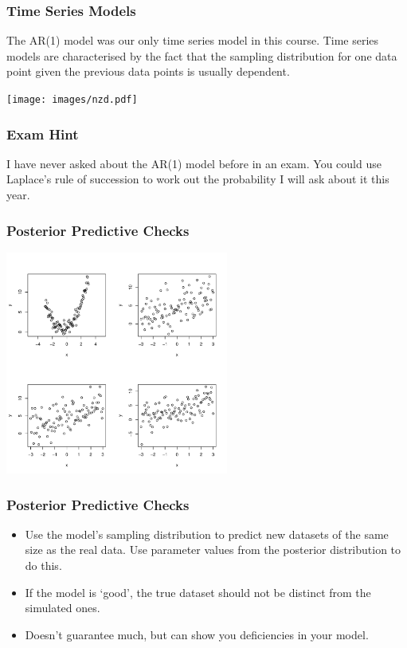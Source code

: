 \documentclass{beamer}
\begin{document}
\begin{frame}[fragile]
\frametitle{Time Series Models}
The AR(1) model was our only time series model in this course.
Time series models are characterised by the fact that the sampling distribution
for one data point given the previous data points is usually dependent.

\centering
\texttt{[image: images/nzd.pdf]}


\end{frame}

\begin{frame}[fragile]
\frametitle{Exam Hint}
I have never asked about the AR(1) model before in an exam. You could use
Laplace's rule of succession to work out the probability I will ask about it
this year.

\end{frame}


\begin{frame}
\frametitle{Posterior Predictive Checks}

\centering
\includegraphics[width=0.55\textwidth]{images/quadratic_lineup.pdf}

\end{frame}

\begin{frame}
\frametitle{Posterior Predictive Checks}

\begin{itemize}
\item Use the model's sampling distribution to predict new datasets of the
same size as the real data. Use parameter values from the posterior distribution
to do this.\pause
\item If the model is `good', the true dataset should not be distinct from
the simulated ones.\pause
\item Doesn't guarantee much, but can show you deficiencies in your model.
\end{itemize}

\end{frame}
\end{document}
